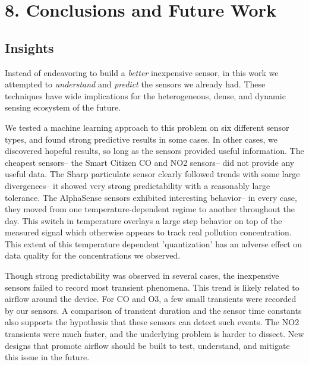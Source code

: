 \chapter{8. Conclusions and Future Work}

\section{Insights}

Instead of endeavoring to build a \textit{better} inexpensive sensor, in this work we attempted to \textit{understand} and \textit{predict} the sensors we already had.  These techniques have wide implications for the heterogeneous, dense, and dynamic sensing ecosystem of the future. 

We tested a machine learning approach to this problem on six different sensor types, and found strong predictive results in some cases. In other cases, we discovered hopeful results, so long as the sensors provided useful information.  The cheapest sensors-- the Smart Citizen CO and NO2 sensors-- did not provide any useful data.  The Sharp particulate sensor clearly followed trends with some large divergences-- it showed very strong predictability with a reasonably large tolerance.  The AlphaSense sensors exhibited interesting behavior-- in every case, they moved from one temperature-dependent regime to another throughout the day.  This switch in temperature overlays a large step behavior on top of the measured signal which otherwise appears to track real pollution concentration.  This extent of this temperature dependent 'quantization' has an adverse effect on data quality for the concentrations we observed.  

Though strong predictability was observed in several cases, the inexpensive sensors failed to record most transient phenomena.  This trend is likely related to airflow around the device.  For CO and O3, a few small transients were recorded by our sensors.  A comparison of transient duration and the sensor time constants also supports the hypothesis that these sensors can detect such events.  The NO2 transients were much faster, and the underlying problem is harder to dissect.  New designs that promote airflow should be built to test, understand, and mitigate this issue in the future.

